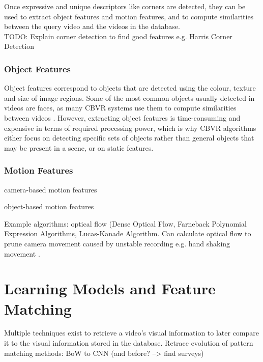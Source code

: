 Once expressive and unique descriptors like corners are detected, they can be used to extract object features and motion features, and to compute similarities between the query video and the videos in the database.\\

TODO: Explain corner detection to find good features e.g. Harris Corner Detection

\subsubsection{Object Features}

Object features correspond to objects that are detected using the colour, texture and size of image regions. Some of the most common objects usually detected in videos are faces, as many CBVR systems use them to compute similarities between videos \cite{sivic2005face}. However, extracting object features is time-consuming and expensive in terms of required processing power, which is why CBVR algorithms either focus on detecting specific sets of objects rather than general objects that may be present in a scene, or on static features.

\subsubsection{Motion Features}

camera-based motion features

object-based motion features

Example algorithms: optical flow (Dense Optical Flow, Farneback Polynomial Expression Algorithms, Lucas-Kanade Algorithm.
Can calculate optical flow to prune camera movement caused by unstable recording e.g. hand shaking movement \cite{wang2016actionregonition}.


\section{Learning Models and Feature Matching}

Multiple techniques exist to retrieve a video's visual information to later compare it to the visual information stored in the database.
Retrace evolution of pattern matching methods: BoW to CNN (and before? --> find surveys)


